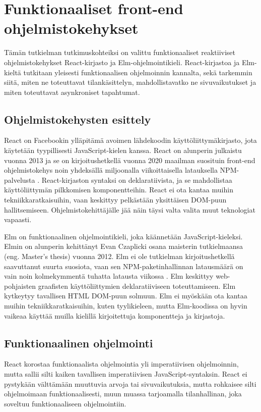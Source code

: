 \chapter{Funktionaaliset front-end ohjelmistokehykset}
Tämän tutkielman tutkimuskohteiksi on valittu funktionaaliset reaktiiviset ohjelmistokehykset React-kirjasto ja
Elm-ohjelmointikieli. React-kirjastoa ja Elm-kieltä tutkitaan yleisesti funktionaalisen ohjelmoinnin kannalta, sekä
tarkemmin siitä, miten ne toteuttavat tilankäsittelyn, mahdollistavatko ne sivuvaikutukset ja miten toteuttavat
asynkroniset tapahtumat.

\section{Ohjelmistokehysten esittely}
React on Facebookin ylläpitämä avoimen lähdekoodin käyttöliittymäkirjasto, jota käytetään tyypillisesti
JavaScript-kielen kanssa. React on alunperin julkaistu vuonna 2013 ja se on kirjoitushetkellä vuonna 2020 maailman
suosituin front-end ohjelmistokehys noin yhdeksällä miljoonalla viikoittaisella latauksella NPM-palvelusta 
\cite{npmtrends}. React-kirjaston syntaksi on deklaratiivista, ja se mahdollistaa käyttöliittymän pilkkomisen
komponentteihin. React ei ota kantaa muihin tekniikkaratkaisuihin, vaan keskittyy pelkästään yksittäisen DOM-puun
hallitsemiseen. Ohjelmistokehittäjälle jää näin täysi valta valita muut teknologiat vapaasti. \cite{reactjs}

Elm on funktionaalinen ohjelmointikieli, joka käännetään JavaScript-kieleksi. Elmin on alunperin kehittänyt Evan
Czaplicki osana maisterin tutkielmaansa (eng. Master's thesis) vuonna 2012. Elm ei ole tutkielman kirjoitushetkellä
saavuttanut suurta suosiota, vaan sen NPM-paketinhallinnan latausmäärä on vain noin kolmekymmentä tuhatta latausta
viikossa \cite{npmtrends}. Elm keskittyy web-pohjaisten graafisten käyttöliittymien deklaratiiviseen toteuttamiseen. Elm
kytkeytyy tavallisen HTML DOM-puun solmuun. Elm ei myöskään ota kantaa muihin tekniikkaratkaisuihin, kuten tyylikieleen,
mutta Elm-koodissa on hyvin vaikeaa käyttää muilla kielillä kirjoitettuja komponentteja ja kirjastoja. \cite{elmlang}

\section{Funktionaalinen ohjelmointi}
React korostaa funktionaalista ohjelmointia yli imperatiivisen ohjelmoinnin, mutta sallii silti kaiken tavallisen
imperatiivisen JavaScript-syntaksin. React ei pystykään välttämään muuttuvia arvoja tai sivuvaikutuksia, mutta rohkaisee
silti ohjelmoimaan funktionaalisesti, muun muassa tarjoamalla tilanhallinan, joka soveltuu funktionaaliseen
ohjelmointiin. \cite{reactjs}

